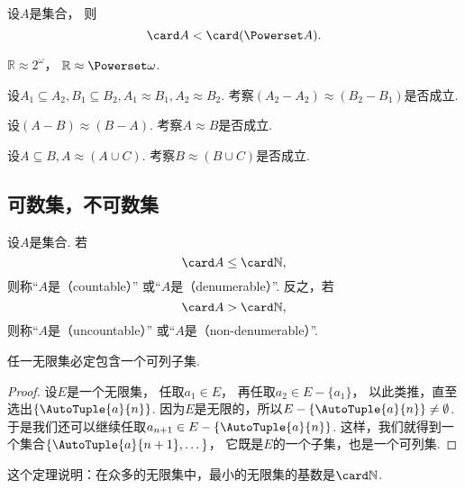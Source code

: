 \begin{proposition}
设\(A\)是集合，
则\[
	\card A < \card(\Powerset A).
\]
\end{proposition}

\begin{example}
\(\mathbb{R}\approx2^\omega\)，
\(\mathbb{R}\approx\Powerset\omega\).
\end{example}

\begin{example}
设\(A_1 \subseteq A_2,
B_1 \subseteq B_2,
A_1 \approx B_1,
A_2 \approx B_2\).
考察\((A_2 - A_2) \approx (B_2 - B_1)\)是否成立.
\end{example}
\begin{example}
设\((A - B) \approx (B - A)\).
考察\(A \approx B\)是否成立.
\end{example}
\begin{example}
设\(A \subseteq B,
A \approx (A \cup C)\).
考察\(B \approx (B \cup C)\)是否成立.
\end{example}

\subsection{可数集，不可数集}
\begin{definition}
设\(A\)是集合.
若\[
	\card A \leq \card\mathbb{N},
\]
则称“\(A\)是（countable）”
或“\(A\)是（denumerable）”.
反之，若\[
	\card A > \card\mathbb{N},
\]
则称“\(A\)是（uncountable）”
或“\(A\)是（non-denumerable）”.
\end{definition}

\begin{theorem}
任一无限集必定包含一个可列子集.
\begin{proof}
设\(E\)是一个无限集，
任取\(a_1 \in E\)，
再任取\(a_2 \in E-\{a_1\}\)，
以此类推，直至选出\(\{\AutoTuple{a}{n}\}\).
因为\(E\)是无限的，所以\(E-\{\AutoTuple{a}{n}\}\neq\emptyset\).
于是我们还可以继续任取\(a_{n+1} \in E-\{\AutoTuple{a}{n}\}\).
这样，我们就得到一个集合\(\{\AutoTuple{a}{n+1},\dotsc\}\)，
它既是\(E\)的一个子集，也是一个可列集.
\end{proof}
\end{theorem}
\begin{remark}
这个定理说明：在众多的无限集中，最小的无限集的基数是\(\card\mathbb{N}\).
\end{remark}

